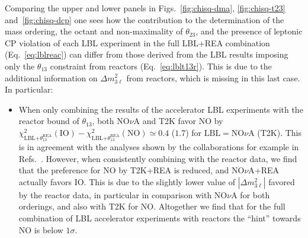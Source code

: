 \documentclass[a4paper, 11pt]{article}
\newcommand{\Dmq}{\Delta m^2}
\begin{document}
Comparing the upper and lower panels in Figs.~\ref{fig:chisq-dma},
\ref{fig:chisq-t23} and~\ref{fig:chisq-dcp} one sees how the
contribution to the determination of the mass ordering, the octant and
non-maximality of $\theta_{23}$, and the presence of leptonic CP
violation of each LBL experiment in the full LBL+REA combination
(Eq.~\ref{eq:lblreac}) can differ from those derived from the LBL
results imposing only the $\theta_{13}$ constraint from reactors
(Eq.~\ref{eq:lblt13r}). This is due to the additional information on
$\Dmq_{3\ell}$ from reactors, which is missing in this last case.  In
particular:
%
\begin{itemize}
\item When only combining the results of the accelerator LBL
  experiments with the reactor bound of $\theta_{13}$, both NO$\nu$A
  and T2K favor NO by
  $\chi^2_\text{LBL+$\theta_{13}^\text{REA}$}(\text{IO})
  -\chi^2_\text{LBL+$\theta_{13}^\text{REA}$}(\text{NO}) \simeq 0.4$
  ($1.7$) for $\text{LBL} = \text{NO$\nu$A}$ (T2K). This is in
  agreement with the analyses shown by the collaborations for example
  in Refs.~\cite{nova:nu2016, t2k:ichep2016}.  However, when
  consistently combining with the reactor data, we find that the
  preference for NO by T2K+REA is reduced, and NO$\nu$A+REA actually
  favors IO. This is due to the slightly lower value of
  $|\Dmq_{3\ell}|$ favored by the reactor data, in particular in
  comparison with NO$\nu$A for both orderings, and also with T2K for
  NO.  Altogether we find that for the full combination of LBL
  accelerator experiments with reactors the ``hint'' towards NO is
  below $1\sigma$.


\end{itemize}
\end{document}
